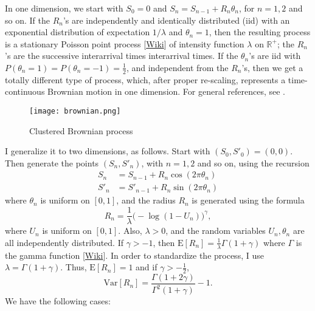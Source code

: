 \documentclass[oneside,10pt]{book}
\begin{document}
  In one dimension, we start with $S_0=0$ and $S_n=S_{n-1}+R_n\theta_n$, for $n=1,2$ and so on. If the $R_n$'s are independently and identically distributed (iid) with an exponential distribution of expectation $1/\lambda$ and $\theta_n=1$, then the resulting process is a stationary
\textcolor{index}{Poisson point process} [\href{https://en.wikipedia.org/wiki/Poisson_point_process}{Wiki}] of
intensity function $\lambda$ on $\mathbb{R}^{+}$; the $R_n$'s are the successive
interarrival times \textcolor{index}{interarrival times}. If the $\theta_n$'s are iid with $P(\theta_n=1)=P(\theta_n=-1)=\frac{1}{2}$, and independent from the $R_n$'s, then we get a totally different type of process, which, after proper re-scaling, represents a time-continuous
 \textcolor{index}{Brownian motion} in one dimension. For general references, see \cite{daleyA2002,daleyB2008}.


\begin{figure}[H]
\centering
\texttt{[image: brownian.png]}
\caption{Clustered Brownian process}
\label{fig:lolbrown}
\end{figure}

I generalize it to two dimensions, as follows. Start with $(S_0,S'_0)=(0,0)$. Then generate the points $(S_n, S'_n)$, with $n=1,2$ and so on, using the recursion
\begin{align}
S_n &  =  S_{n-1}+R_n \cos(2\pi\theta_n) \label{brown10} \\
S'_n & = S'_{n-1}+ R_n\sin(2\pi\theta_n) \label{brown11}
\end{align}
where $\theta_n$ is uniform on $[0, 1]$, and the radius $R_n$ is generated using the formula
\begin{equation}
R_n=\frac{1}{\lambda}\Big(-\log(1-U_n)\Big)^\gamma, \label{gam11}
\end{equation}
where $U_n$ is uniform on $[0,1]$. Also, $\lambda>0$, and the random variables $U_n,\theta_n$ are all independently distributed. If $\gamma>-1$, then
$\mbox{E}[R_n]=\frac{1}{\lambda}\Gamma(1+\gamma)$ where $\Gamma$ is the \textcolor{index}{gamma function}
[\href{https://en.wikipedia.org/wiki/Gamma_function}{Wiki}]. In order to standardize the process, I use
$\lambda=\Gamma(1+\gamma)$. Thus, $\mbox{E}[R_n]=1$ and if $\gamma>-\frac{1}{2}$,
$$\mbox{Var}[R_n]=\frac{\Gamma(1+2\gamma)}{\Gamma^2(1+\gamma)}-1.$$
We have the following cases:
\end{document}
